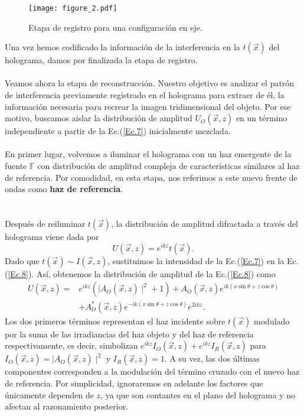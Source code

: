 \documentclass[12pt]{article}
\begin{document}
\begin{figure}[bt!]
    \centering
    \texttt{[image: figure\_2.pdf]}\\
    \caption{Etapa de registro para una configuración en eje.}
    \label{figura2}
\end{figure}
Una vez hemos codificado la información de la interferencia en la $t (\vec{x})$ del holograma, damos por finalizada la etapa de registro.  \\ \\
Veamos ahora la etapa de reconstrucción. Nuestro objetivo es analizar el patrón de interferencia previamente registrado en el holograma para extraer de él, la información necesaria para recrear la imagen tridimensional del objeto.  Por ese motivo, buscamos aislar la distribución de amplitud $ U_O (\Vec{x}, z)$ en un término independiente a partir de la Ec.(\ref{Ec.7}) inicialmente mezclada. \\ \\
En primer lugar, volvemos a iluminar el holograma con un haz emergente de la fuente  $\mathbb{F}$ con distribución de amplitud compleja de características similares al haz de referencia. Por comodidad, en esta etapa, nos referimos  a este nuevo frente de ondas como  \textbf{haz de referencia}. \\ \\ \\
Después de reiluminar $t(\Vec{x})$,  la distribución de amplitud difractada a través del holograma  viene dada por
\begin{equation}
    U(\Vec{x}, z) = e^{ i k z} t (\Vec{x}).
    \label{Ec.8}
\end{equation}
Dado que $t (\Vec{x}) \sim I (\Vec{x}, z)$,  sustituimos  la intensidad de la Ec.(\ref{Ec.7}) en  la Ec.(\ref{Ec.8}). Así, obtenemos la distribución de amplitud  de la Ec.(\ref{Ec.8}) como
\begin{align}
     U(\Vec{x}, z)=&  e^{i k z}  \left( \mid A_O (\Vec{x}, z) \mid ^{2} +  1 \right) +  A_O (\Vec{x}, z) e^{i k (x \sin{\theta}+ z\cos{\theta})} \nonumber \\
     &+ A_O^{*}(\Vec{x}, z) e^{- i k (x \sin{\theta}+ z\cos{\theta})} e^{ 2 i k z}.
      \label{Ec.9}
\end{align}
 Los dos primeros términos representan el haz incidente sobre $t(\Vec{x})$ modulado por la suma de las irradiancias del haz objeto y del haz de referencia respectivamente, es decir, simbolizan $e^{i k z} I_O (\Vec{x}, z) +  e^{ i k z} I_R (\Vec{x}, z)$ para  $I_O (\Vec{x}, z) = \mid A_O (\Vec{x}, z) \mid ^{2}$ y $I_R (\Vec{x}, z) = 1$. A su vez, las dos últimas componentes corresponden a la modulación del término cruzado con el nuevo haz de referencia.  Por simplicidad, ignoraremos en adelante los factores que únicamente dependen de $z$, ya que son contantes en el plano del holograma y no afectan al razonamiento posterior.\\ \\
\end{document}
